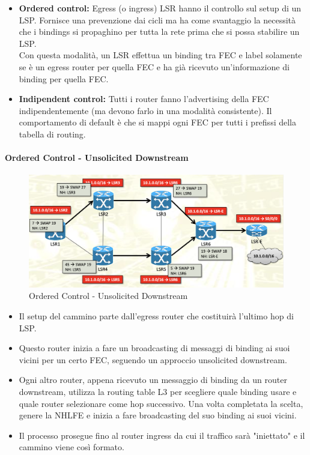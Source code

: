 \documentclass{article}
\begin{document}
\begin{itemize}
    \item \textbf{Ordered control:} Egress (o ingress) LSR hanno il controllo sul setup di un LSP. Fornisce una prevenzione dai cicli ma ha come svantaggio la necessità che i bindings si propaghino per tutta la rete prima che si possa stabilire un LSP.\\
    Con questa modalità, un LSR effettua un binding tra FEC e label solamente se è un egress router per quella FEC e ha già ricevuto un'informazione di binding per quella FEC.
    \item \textbf{Indipendent control:} Tutti i router fanno l'advertising della FEC indipendentemente (ma devono farlo in una modalità consistente). Il comportamento di default è che si mappi ogni FEC per tutti i prefissi della tabella di routing.
\end{itemize}

\paragraph{Ordered Control - Unsolicited Downstream}

\begin{figure}[H]
    \centering
    \includegraphics[scale=0.4]{figures/ordered control unsolicited downstream.png}
    \caption{Ordered Control - Unsolicited Downstream}
\end{figure}

\begin{itemize}
    \item Il setup del cammino parte dall'egress router che costituirà l'ultimo hop di LSP.
    \item Questo router inizia a fare un broadcasting di messaggi di binding ai suoi vicini per un certo FEC, seguendo un approccio unsolicited downstream.
    \item Ogni altro router, appena ricevuto un messaggio di binding da un router downstream, utilizza la routing table L3 per scegliere quale binding usare e quale router selezionare come hop successivo. Una volta completata la scelta, genere la NHLFE e inizia a fare broadcasting del suo binding ai suoi vicini.
    \item Il processo prosegue fino al router ingress da cui il traffico sarà "iniettato" e il cammino viene così formato.
\end{itemize}
\end{document}
